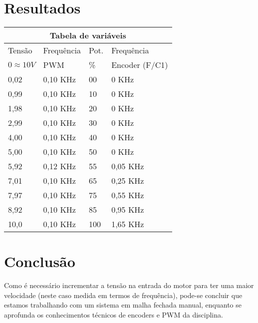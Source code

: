 \documentclass{article}
\begin{document}
\section{Resultados}

\begin{center}
\begin{tabular}{ |p{1.5cm}||p{1.7cm}|p{1cm}|p{2.5cm}|  }
 \hline
 \multicolumn{4}{|c|}{Tabela de variáveis} \\
 \hline
 Tensão & Frequência & Pot. & Frequência\\
  \hline
 $0 \approx 10V$ & PWM & \% & Encoder (F/C1)\\
  \hline
  0,02 & 0,10 KHz& 00 & 0 KHz\\
  0,99 & 0,10 KHz& 10 & 0 KHz\\
  1,98 & 0,10 KHz& 20 & 0 KHz\\
  2,99 & 0,10 KHz& 30 & 0 KHz\\
  4,00 & 0,10 KHz& 40 & 0 KHz\\
  5,00 & 0,10 KHz& 50 & 0 KHz\\
  5,92 & 0,12 KHz& 55 & 0,05 KHz\\
  7,01 & 0,10 KHz& 65 & 0,25 KHz\\
  7,97 & 0,10 KHz& 75 & 0,55 KHz\\
  8,92 & 0,10 KHz& 85 & 0,95 KHz\\
  10,0 & 0,10 KHz& 100 & 1,65 KHz\\
 \hline
\end{tabular}
\end{center}

\section{Conclusão}
Como é necessário incrementar a tensão na entrada do motor para ter uma maior velocidade (neste caso medida em termos de frequência), pode-se concluir que estamos trabalhando com um sistema em malha fechada manual, enquanto se aprofunda os conhecimentos técnicos de encoders e PWM da disciplina.
\end{document}
